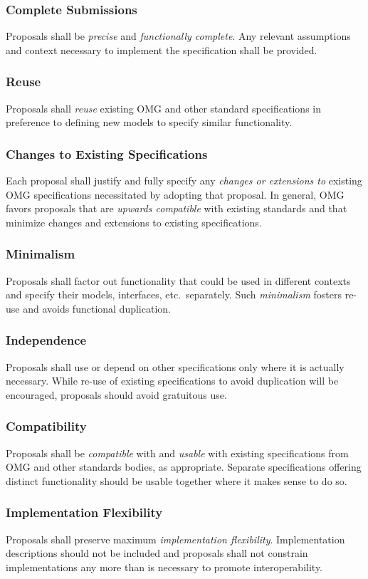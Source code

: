 \subsubsection{Complete Submissions}
Proposals shall be \textit{precise} and \textit{functionally complete}. Any relevant assumptions and context necessary to implement the specification shall be provided.
\subsubsection{Reuse}
Proposals shall \textit{reuse} existing OMG and other standard specifications in preference to defining new models to specify similar functionality.
\subsubsection{Changes to Existing Specifications}
Each proposal shall justify and fully specify any \textit{changes or extensions to} existing OMG specifications necessitated by adopting that proposal. In general, OMG favors proposals that are \textit{upwards compatible} with existing standards and that minimize changes and extensions to existing specifications.
\subsubsection{Minimalism}
Proposals shall factor out functionality that could be used in different contexts and specify their models, interfaces, etc.\ separately. Such \textit{minimalism} fosters re-use and avoids functional duplication.
\subsubsection{Independence}
Proposals shall use or depend on other specifications only where it is actually necessary. While re-use of existing specifications to avoid duplication will be encouraged, proposals should avoid gratuitous use.
\subsubsection{Compatibility}
Proposals shall be \textit{compatible} with and \textit{usable} with existing specifications from OMG and other standards bodies, as appropriate. Separate specifications offering distinct functionality should be usable together where it makes sense to do so.
\subsubsection{Implementation Flexibility}
Proposals shall preserve maximum \textit{implementation flexibility}. Implementation descriptions should not be included and proposals shall not constrain implementations any more than is necessary to promote interoperability.

